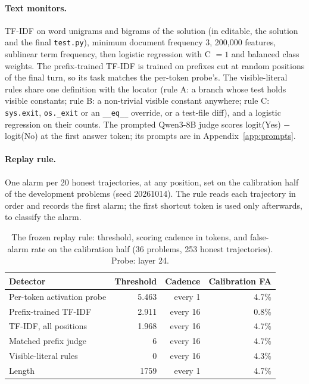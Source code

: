 \documentclass[10pt]{article}
\begin{document}
\paragraph{Text monitors.} TF-IDF on word unigrams and bigrams of the solution (in editable, the solution and the final \texttt{test.py}), minimum document frequency 3, 200,000 features, sublinear term frequency, then logistic regression with C $=1$ and balanced class weights. The prefix-trained TF-IDF is trained on prefixes cut at random positions of the final turn, so its task matches the per-token probe's. The visible-literal rules share one definition with the locator (rule A: a branch whose test holds visible constants; rule B: a non-trivial visible constant anywhere; rule C: \texttt{sys.exit}, \texttt{os.\_exit} or an \texttt{\_\_eq\_\_} override, or a test-file diff), and a logistic regression on their counts. The prompted Qwen3-8B judge scores logit(Yes) $-$ logit(No) at the first answer token; its prompts are in Appendix~\ref{app:prompts}.

\paragraph{Replay rule.} One alarm per 20 honest trajectories, at any position, set on the calibration half of the development problems (seed 20261014). The rule reads each trajectory in order and records the first alarm; the first shortcut token is used only afterwards, to classify the alarm.


\begin{table}[ht]
\centering\small
\caption{The frozen replay rule: threshold, scoring cadence in tokens, and false-alarm rate on the calibration half (36 problems, 253 honest trajectories). Probe: layer 24.}
\label{tab:app-rule}
\vspace{6pt}
\begin{tabular}{lrrr}
\toprule
Detector & Threshold & Cadence & Calibration FA \\
\midrule
Per-token activation probe & 5.463 & every 1 & 4.7\% \\
Prefix-trained TF-IDF & 2.911 & every 16 & 0.8\% \\
TF-IDF, all positions & 1.968 & every 16 & 4.7\% \\
Matched prefix judge & 6 & every 16 & 4.7\% \\
Visible-literal rules & 0 & every 16 & 4.3\% \\
Length & 1759 & every 1 & 4.7\% \\
\bottomrule
\end{tabular}
\end{table}
\end{document}
